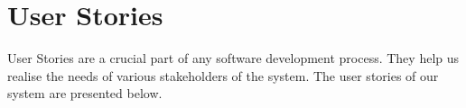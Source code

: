 \documentclass[conference]{IEEEtran}
\begin{document}

\section{User Stories}
\label{section:userstories}
User Stories are a crucial part of any software development process. They help us realise the needs of various stakeholders of the system. The user stories of our system are presented below.
\end{document}
